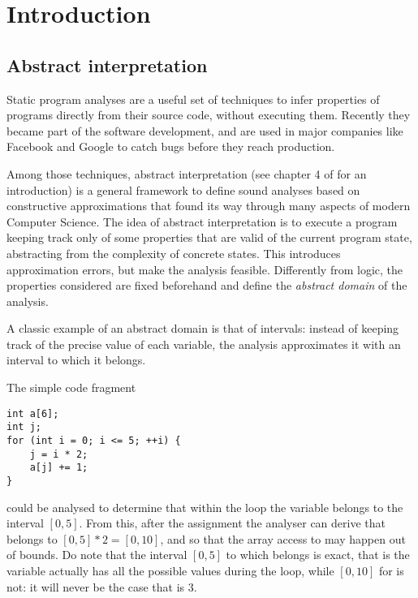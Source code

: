 \chapter{Introduction}
\section{Abstract interpretation}
Static program analyses are a useful set of techniques to infer properties of programs directly from their source code, without executing them. Recently they became part of the software development, and are used in major companies like Facebook \cite{distefano-static-analysis-fb} and Google \cite{static-analysis-google} to catch bugs before they reach production.

Among those techniques, abstract interpretation \cite{cousot-77,cousot-79,cousot-92} (see chapter 4 of \cite{principles-of-program-analysis-book} for an introduction) is a general framework to define sound analyses based on constructive approximations that found its way through many aspects of modern Computer Science.
The idea of abstract interpretation is to execute a program keeping track only of some properties that are valid of the current program state, abstracting from the complexity of concrete states. This introduces approximation errors, but make the analysis feasible. Differently from logic, the properties considered are fixed beforehand and define the \textit{abstract domain} of the analysis.

\begin{example}[Intervals]\label{intr:ex:intervals}
	A classic example of an abstract domain is that of intervals: instead of keeping track of the precise value of each variable, the analysis approximates it with an interval to which it belongs.

	The simple code fragment
	\begin{verbatim}
int a[6];
int j;
for (int i = 0; i <= 5; ++i) {
	j = i * 2;
	a[j] += 1;
}
	\end{verbatim}
	could be analysed to determine that within the loop the variable  belongs to the interval $[0, 5]$. From this, after the assignment  the analyser can derive that  belongs to $[0, 5] * 2 = [0, 10]$, and so that the array access to  may happen out of bounds.
	Do note that the interval $[0, 5]$ to which  belongs is exact, that is the variable actually has all the possible values during the loop, while $[0, 10]$ for  is not: it will never be the case that  is $3$.
\end{example}

